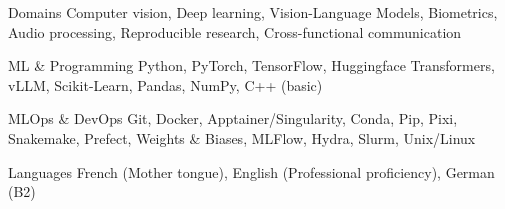 

\begin{cvskills}

  \cvskill
    {Domains} %
    {Computer vision, Deep learning, Vision-Language Models, Biometrics, Audio processing, Reproducible research, Cross-functional communication} %

  \cvskill
    {ML \& Programming} %
    {Python, PyTorch, TensorFlow, Huggingface Transformers, vLLM, Scikit-Learn, Pandas, NumPy, C++ (basic)} %

  \cvskill
    {MLOps \& DevOps} %
    {Git, Docker, Apptainer/Singularity, Conda, Pip, Pixi, Snakemake, Prefect, Weights \& Biases, MLFlow, Hydra, Slurm, Unix/Linux} %

  \cvskill
    {Languages} %
    {French (Mother tongue), English (Professional proficiency), German (B2)} %

\end{cvskills}
